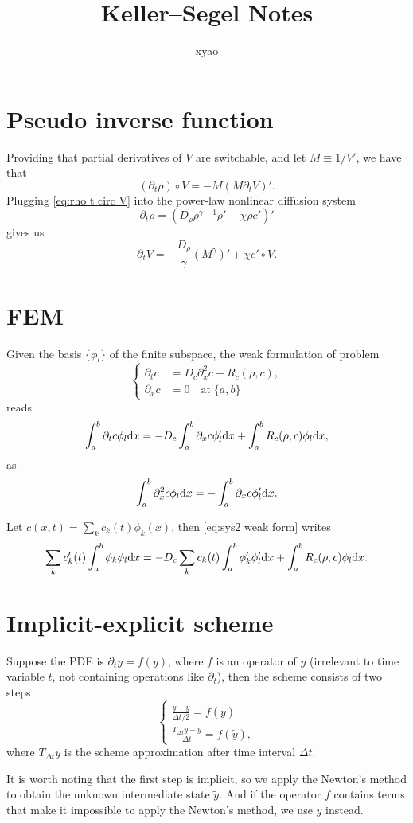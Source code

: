 \documentclass{article}
\title{Keller--Segel Notes}
\author{xyao}
\begin{document}
  \maketitle
  \section{Pseudo inverse function}
  Providing that partial derivatives of $V$ are switchable, and let $M\equiv 1 / V'$, we have that
  \begin{equation}
    \label{eq:rho t circ V}
    (\partial_t\rho)\circ V = -M(M\partial_t V)'.
  \end{equation}
  Plugging \cref{eq:rho t circ V} into the power-law nonlinear diffusion system
  \[
    \partial_t \rho = \left(D_{\rho}\rho^{\gamma - 1}\rho' - \chi\rho c'\right)'
  \]
  gives us
  \[
    \partial_t V = -\frac{D_\rho}{\gamma}(M^\gamma)' + \chi c'\circ V.
  \]

  \section{FEM}
  Given the basis $\{\phi_l\}$ of the finite subspace, the weak formulation of problem
  \[
    \left\{
      \begin{aligned}
        \partial_t c &= D_c \partial_x^2 c + R_c(\rho, c), \\
        \partial_x c &= 0\quad\text{at}\;\{a,b\}
      \end{aligned}
    \right.
  \]
  reads
  \begin{equation}
    \label{eq:sys2 weak form}
    \int_a^b \partial_t c \phi_l\mathrm d x = - D_c\int_a^b \partial_x c\phi_l'\mathrm d x
                                          + \int_a^b R_c(\rho, c)\phi_l\mathrm d x,
  \end{equation}
  as
  \[
    \int_a^b \partial^2_x c\phi_l \mathrm d x = - \int_a^b \partial_x c\phi_l'\mathrm d x.
  \]

  Let $c(x, t) = \sum_k c_k(t)\phi_k(x)$, then \cref{eq:sys2 weak form} writes
  \[
    \sum_k c'_k(t)\int_a^b\phi_k\phi_l\mathrm d x = - D_c\sum_k c_k(t)\int_a^b\phi_k'\phi_l'\mathrm d x
                                                + \int_a^b R_c(\rho, c)\phi_l\mathrm d x.
  \]

  \section{Implicit-explicit scheme}
  Suppose the PDE is $\partial_t y = f(y)$, where $f$ is an operator of $y$ (irrelevant to time
  variable $t$, not containing operations like $\partial_t$), then the scheme consists of two steps
  \[
    \left\{
      \begin{aligned}
        \frac{\tilde y - y}{\Delta t / 2} = f(\tilde y)\\
        \frac{T_{\Delta t}y - y}{\Delta t} = f(\tilde y),
      \end{aligned}
    \right.
  \]
  where $T_{\Delta t}y$ is the scheme approximation after time interval $\Delta t$.

  It is worth noting that the first step is implicit, so we apply the Newton's method to obtain
  the unknown intermediate state $\tilde y$. And if the operator $f$ contains terms that make
  it impossible to apply the Newton's method, we use $y$ instead.
\end{document}
